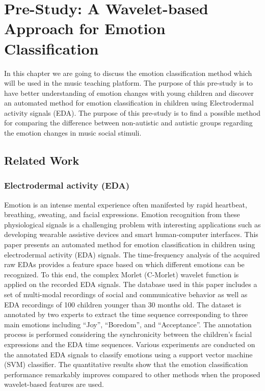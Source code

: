 \chapter{Pre-Study: A Wavelet-based Approach for Emotion Classification}
In this chapter we are going to discuss the emotion classification method which will be
used in the music teaching platform. The purpose of this pre-study is to have better
understanding of emotion changes with young children and discover an automated method
for emotion classification in children using Electrodermal activity signals (EDA). 
The purpose of this pre-study is to find a possible method for comparing the difference 
between non-autistic and autistic groups regarding the emotion changes in music social stimuli.\\

\section{Related Work}
\subsection{Electrodermal activity (EDA)}
Emotion is an intense mental experience often manifested by rapid heartbeat, breathing, 
sweating, and facial expressions. Emotion recognition from these physiological signals 
is a challenging problem with interesting applications such as developing wearable 
assistive devices and smart human-computer interfaces. This paper presents an automated 
method for emotion classification in children using electrodermal activity (EDA) signals. 
The time-frequency analysis of the acquired raw EDAs provides a feature space based on 
which different emotions can be recognized. To this end, the complex Morlet (C-Morlet) 
wavelet function is applied on the recorded EDA signals. The database used in this paper 
includes a set of multi-modal recordings of social and communicative behavior as well 
as EDA recordings of 100 children younger than 30 months old. The dataset is annotated 
by two experts to extract the time sequence corresponding to three main emotions 
including “Joy”, “Boredom”, and “Acceptance”. The annotation process is performed 
considering the synchronicity between the children's facial expressions and the EDA 
time sequences. Various experiments are conducted on the annotated EDA signals to 
classify emotions using a support vector machine (SVM) classifier. The quantitative 
results show that the emotion classification performance remarkably improves compared 
to other methods when the proposed wavelet-based features are used.\\

